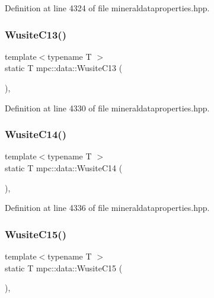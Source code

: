 Definition at line 4324 of file mineraldataproperties.\+hpp.

\mbox{\label{namespacempc_1_1data_a638ce65e87b41c510edc5ebf725d0ad7}} 
\subsubsection{\texorpdfstring{Wusite\+C13()}{WusiteC13()}}
{\footnotesize\ttfamily template$<$typename T $>$ \\
static T mpc\+::data\+::\+Wusite\+C13 (\begin{DoxyParamCaption}{ }\end{DoxyParamCaption})\hspace{0.3cm}{\ttfamily [inline]}, {\ttfamily [static]}}



Definition at line 4330 of file mineraldataproperties.\+hpp.

\mbox{\label{namespacempc_1_1data_a32420a5c752c50834b79c3c944e018e7}} 
\subsubsection{\texorpdfstring{Wusite\+C14()}{WusiteC14()}}
{\footnotesize\ttfamily template$<$typename T $>$ \\
static T mpc\+::data\+::\+Wusite\+C14 (\begin{DoxyParamCaption}{ }\end{DoxyParamCaption})\hspace{0.3cm}{\ttfamily [inline]}, {\ttfamily [static]}}



Definition at line 4336 of file mineraldataproperties.\+hpp.

\mbox{\label{namespacempc_1_1data_afdfdf0a397941120f097f3200b67c374}} 
\subsubsection{\texorpdfstring{Wusite\+C15()}{WusiteC15()}}
{\footnotesize\ttfamily template$<$typename T $>$ \\
static T mpc\+::data\+::\+Wusite\+C15 (\begin{DoxyParamCaption}{ }\end{DoxyParamCaption})\hspace{0.3cm}{\ttfamily [inline]}, {\ttfamily [static]}}



